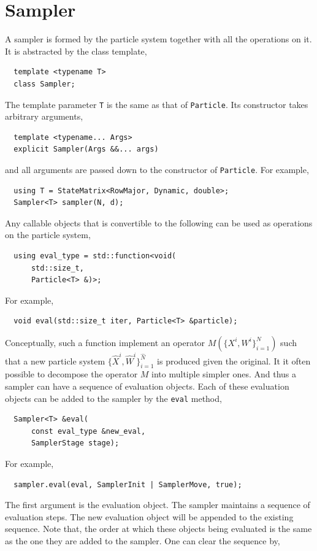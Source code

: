 \section{Sampler}
\label{sec:Sampler}

A sampler is formed by the particle system together with all the operations on
it. It is abstracted by the class template,
\begin{Verbatim}
  template <typename T>
  class Sampler;
\end{Verbatim}
The template parameter \verb|T| is the same as that of \verb|Particle|. Its
constructor takes arbitrary arguments,
\begin{Verbatim}
  template <typename... Args>
  explicit Sampler(Args &&... args)
\end{Verbatim}
and all arguments are passed down to the constructor of \verb|Particle|. For
example,
\begin{Verbatim}
  using T = StateMatrix<RowMajor, Dynamic, double>;
  Sampler<T> sampler(N, d);
\end{Verbatim}
Any callable objects that is convertible to the following can be used as
operations on the particle system,
\begin{Verbatim}
  using eval_type = std::function<void(
      std::size_t,
      Particle<T> &)>;
\end{Verbatim}
For example,
\begin{Verbatim}
  void eval(std::size_t iter, Particle<T> &particle);
\end{Verbatim}
Conceptually, such a function implement an operator $M(\{X^i,W^i\}_{i=1}^N)$
such that a new particle system $\{\hat{X}^i,\hat{W}^i\}_{i=1}^{\hat{N}}$ is
produced given the original. It it often possible to decompose the operator $M$
into multiple simpler ones. And thus a sampler can have a sequence of
evaluation objects. Each of these evaluation objects can be added to the
sampler by the \verb|eval| method,
\begin{Verbatim}
  Sampler<T> &eval(
      const eval_type &new_eval,
      SamplerStage stage);
\end{Verbatim}
For example,
\begin{Verbatim}
  sampler.eval(eval, SamplerInit | SamplerMove, true);
\end{Verbatim}
The first argument is the evaluation object. The sampler maintains a sequence
of evaluation steps. The new evaluation object will be appended to the existing
sequence. Note that, the order at which these objects being evaluated is the
same as the one they are added to the sampler. One can clear the sequence by,
